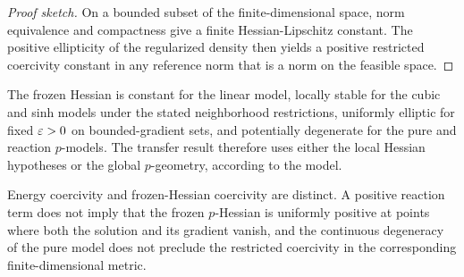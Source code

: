\begin{proof}[Proof sketch]
On a bounded subset of the finite-dimensional space, norm equivalence and compactness give a finite Hessian-Lipschitz constant.  The positive ellipticity of the regularized density then yields a positive restricted coercivity constant in any reference norm that is a norm on the feasible space.
\end{proof}

The frozen Hessian is constant for the linear model, locally stable for the cubic and sinh models under the stated neighborhood restrictions, uniformly elliptic for fixed $\varepsilon>0$ on bounded-gradient sets, and potentially degenerate for the pure and reaction $p$-models.  The transfer result therefore uses either the local Hessian hypotheses or the global $p$-geometry, according to the model.


Energy coercivity and frozen-Hessian coercivity are distinct. A positive reaction term does
not imply that the frozen \(p\)-Hessian is uniformly positive at points where both the solution and its
gradient vanish, and the continuous degeneracy of the pure model does not preclude the restricted
coercivity in the corresponding finite-dimensional metric.
